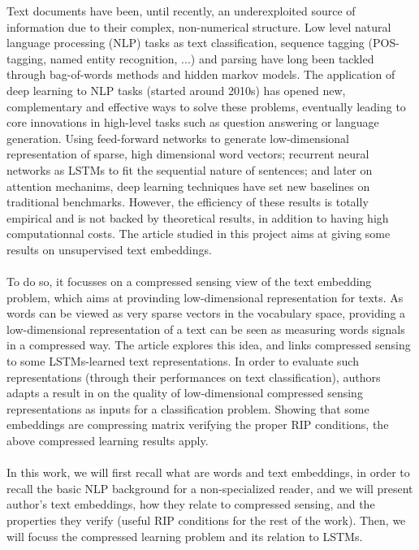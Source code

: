 \documentclass{article}
\begin{document}
Text documents have been, until recently, an underexploited
source of information due to their complex, non-numerical
structure. Low level natural language processing (NLP)
tasks as text classification, 
sequence tagging (POS-tagging, named entity recognition, ...) and 
parsing have long been tackled through bag-of-words methods 
and hidden markov models. The application of deep learning 
to NLP tasks (started around 2010s) has opened new, complementary 
and effective ways to solve these problems, eventually leading to core
innovations in high-level tasks such as question answering or 
language generation. Using feed-forward networks 
to generate low-dimensional representation of sparse, high 
dimensional word vectors; recurrent neural networks as LSTMs
to fit the sequential nature of sentences; and later on attention mechanims,
deep learning techniques have set new baselines on traditional benchmarks. 
However, the efficiency of these results is totally empirical 
and is not backed by theoretical results, in addition to having 
high computationnal costs. The article studied in this project \cite{arora2018sensing}
aims at giving some results on unsupervised text embeddings. 
\\ \\
To do so, it focusses on a compressed sensing view of the text 
embedding problem, which aims at provinding low-dimensional representation
for texts. As words can be viewed 
as very sparse vectors in the vocabulary space, providing a 
low-dimensional representation of a text can be seen as measuring 
words signals in a compressed way. The article explores this idea, 
and links compressed sensing to some LSTMs-learned text representations.
In order to evaluate such representations (through their 
performances on text classification), authors
 adapts a result in \cite{Calderbank2009CompressedL} on the quality
of low-dimensional compressed sensing representations as inputs
for a classification problem. Showing that some embeddings are 
compressing matrix verifying the proper RIP conditions, 
the above compressed learning results apply.  \\ \\
In this work, we will first recall what are words and text embeddings, 
in order to recall the basic NLP background for a non-specialized reader,
and we will present author's text embeddings, how they 
relate to compressed sensing, and the properties they verify 
(useful RIP conditions for the rest of the work).
Then, we will focuss the compressed 
learning problem and its relation to LSTMs. 
\end{document}
